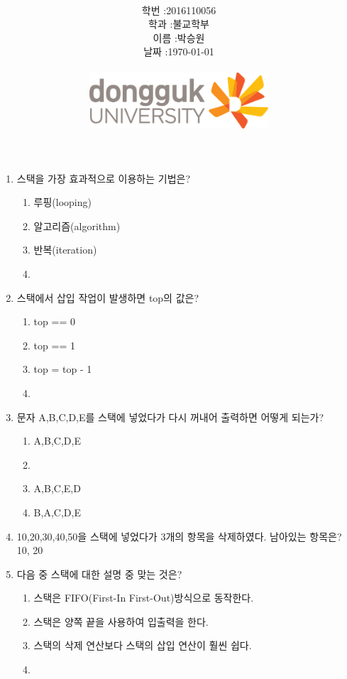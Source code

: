\documentclass[11pt,a4paper]{article}
\title{
	\centering
	\pgfornament[width=12cm,color=teal]{84}\\
	\vspace{1cm}
	\fontsize{50}{50} \selectfont {자료구조와 실습\\5장 스택 연습문제}\\
		\pgfornament[width=12cm,color=teal]{88}\\
	\vfill}
\author{
	\LARGE
	\begin{tabular}{rl}
		\hline
		학번 : & 2016110056\\ 
		학과 : & 불교학부 \\
		이름 : & 박승원\\
		날짜 : & \today\\
		\hline
	\end{tabular}\vspace{2cm}
	\\
\includegraphics[width=0.5\textwidth]{logo.jpg}
	}
\date{}
\begin{document}
\maketitle


\newpage


\noindent
\begin{enumerate}
	

\item 스택을 가장 효과적으로 이용하는 기법은?
\begin{enumerate}

	\item 루핑(looping)
	\item 알고리즘(algorithm)
	\item 반복(iteration)
	\item {}
\end{enumerate}

\item 스택에서 삽입 작업이 발생하면 top의 값은?
	\begin{enumerate}
	\item top == 0
	\item top == 1
	\item top = top - 1
	\item {}
	\end{enumerate}
	
\item 문자 A,B,C,D,E를 스택에 넣었다가 다시 꺼내어 출력하면 어떻게 되는가?
	\begin{enumerate}
		\item A,B,C,D,E
		\item {}
		\item A,B,C,E,D
		\item B,A,C,D,E
	\end{enumerate}

\item 10,20,30,40,50을 스택에 넣었다가 3개의 항목을 삭제하였다. 남아있는 항목은?\\
10, 20

\item 다음 중 스택에 대한 설명 중 맞는 것은?
	\begin{enumerate}
		\item 스택은 FIFO(First-In First-Out)방식으로 동작한다.
		\item 스택은 양쪽 끝을 사용하여 입출력을 한다.
		\item 스택의 삭제 연산보다 스택의 삽입 연산이 훨씬 쉽다.
		\item {}
	\end{enumerate}


\end{enumerate}
\end{document}
